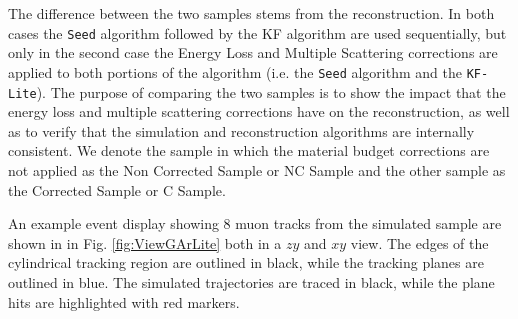 The difference between the two samples stems from the reconstruction. In both cases the \texttt{Seed} algorithm followed by the KF algorithm are used sequentially, but only in the second case the Energy Loss and Multiple Scattering corrections are applied to both portions of the algorithm (i.e. the \texttt{Seed} algorithm and the \texttt{KF-Lite}). The purpose of comparing the two samples is to show the impact that the energy loss and multiple scattering corrections have on the reconstruction, as well as to verify that the simulation and reconstruction algorithms are internally consistent. We denote the sample in which the material budget corrections are not applied as the Non Corrected Sample or NC Sample and the other sample as the Corrected Sample or C Sample.

An example event display showing 8 muon tracks from the simulated sample are shown in in Fig. \ref{fig:ViewGArLite} both in a $zy$ and $xy$ view. The edges of the cylindrical tracking region are outlined in black, while the tracking planes are outlined in blue. The simulated trajectories are traced in black, while the plane hits are highlighted with red markers.

